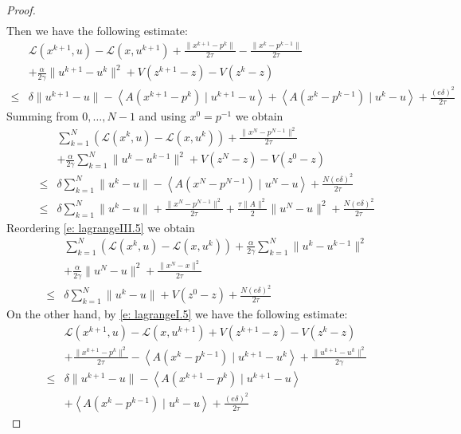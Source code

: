 \documentclass[11pt]{report}
\newcommand{\scal}[2]{{\left\langle{{#1}\mid{#2}}\right\rangle}}
\theoremstyle{plain}{\theorembodyfont{\rmfamily}%
\newtheorem{assumption}[theorem]{Assumption}}
\theoremstyle{plain}{\theorembodyfont{\rmfamily}%
\newtheorem{algorithm}[theorem]{Algorithm}}
\theoremstyle{plain}{\theorembodyfont{\rmfamily}%
\newtheorem{example}[theorem]{Example}}
\theoremstyle{plain}{\theorembodyfont{\rmfamily}%
\newtheorem{remark}[theorem]{Remark}}
\theoremstyle{plain}{\theorembodyfont{\rmfamily}%
\newtheorem{definition}[theorem]{Definition}}
\theoremstyle{plain}{\theorembodyfont{\rmfamily}%
\newtheorem{problem}[theorem]{Problem}}
\numberwithin{equation}{chapter}
\newcommand{\dal}{u}
\newcommand{\prim}{x}
\newcommand{\proj}{p}
\begin{document}
\begin{proof}
\begin{align}
    \end{align}
   Then we have the following estimate:
\begin{align}
        &\mathcal{L}(\prim^{k+1},\dal)-\mathcal{L}(\prim,\dal^{k+1})+\frac{\|\prim^{k+1}-\proj^{k}\|}{2\tau}-\frac{\|\prim^{k}-\proj^{k-1}\|}{2\tau}\nonumber\\&+\frac{\alpha}{2\gamma}\|\dal^{k+1}-\dal^k\|^2+V(z^{k+1}-z)-V(z^{k}-z)\nonumber\\ \leq& \delta\|\dal^{k+1}-\dal\| -\scal{A(\prim^{k+1}-\proj^{k})}{\dal^{k+1}-\dal} +\scal{A(\prim^{k}-\proj^{k-1})}{\dal^{k}-\dal}+\frac{(e\delta)^2}{2\tau}
        \label{e: lagrangeII}
    \end{align}
    Summing from $0,\ldots,N-1$ and using $\prim^0=\proj^{-1}$ we obtain 
    \begin{align}
        &\sum_{k=1}^{N}\left(\mathcal{L}(\prim^{k},\dal)-\mathcal{L}(\prim,\dal^{k})\right)+\frac{\|\prim^{N}-\proj^{N-1}\|^2}{2\tau}\nonumber\\&+\frac{\alpha}{2\gamma}\sum_{k=1}^{N}\|\dal^{k}-\dal^{k-1}\|^2+V(z^{N}-z)-V(z^{0}-z) \nonumber\\\leq& \delta\sum_{k=1}^{N}\|\dal^{k}-\dal\| -\scal{A(\prim^{N}-\proj^{N-1})}{\dal^{N}-\dal}+\frac{N(e\delta)^2}{2\tau}\nonumber\\\leq& \delta\sum_{k=1}^{N}\|\dal^{k}-\dal\| +\frac{\|\prim^{N}-\proj^{N-1}\|^2}{2\tau}+\frac{\tau\|A\|^2}{2}\|\dal^{N}-\dal\|^2+\frac{N(e\delta)^2}{2\tau}
        \label{e: lagrangeIII.5}
    \end{align}
    Reordering \eqref{e: lagrangeIII.5} we obtain
     \begin{align}
        &\sum_{k=1}^{N}\left(\mathcal{L}(\prim^{k},\dal)-\mathcal{L}(\prim,\dal^{k})\right)+\frac{\alpha}{2\gamma}\sum_{k=1}^{N}\|\dal^{k}-\dal^{k-1}\|^2\nonumber\\&+\frac{\alpha}{2\gamma}\|\dal^{N}-\dal\|^2+\frac{\|\prim^{N}-\prim\|^2}{2\tau} \nonumber\\\leq& \delta\sum_{k=1}^{N}\|\dal^{k}-\dal\|+V(z^{0}-z)+\frac{N(e\delta)^2}{2\tau}
        \label{e: lagrangeIV.5}
    \end{align}
 On the other hand, by \eqref{e: lagrangeI.5} we have the following estimate:
\begin{align}
        &\mathcal{L}(\prim^{k+1},\dal)-\mathcal{L}(\prim,\dal^{k+1})+V(z^{k+1}-z)-V(z^{k}-z)\nonumber\\&+\frac{\|\prim^{k+1}-\proj^{k}\|^2}{2\tau}-\scal{A(\prim^{k}-\proj^{k-1})}{\dal^{k+1}-\dal^k}+\frac{\|\dal^{k+1}-\dal^k\|^2}{2\gamma}\nonumber\\ \leq& \delta\|\dal^{k+1}-\dal\| -\scal{A(\prim^{k+1}-\proj^{k})}{\dal^{k+1}-\dal} \nonumber\\&+\scal{A(\prim^{k}-\proj^{k-1})}{\dal^{k}-\dal}+\frac{(e\delta)^2}{2\tau}

\end{align}
\end{proof}
\end{document}
